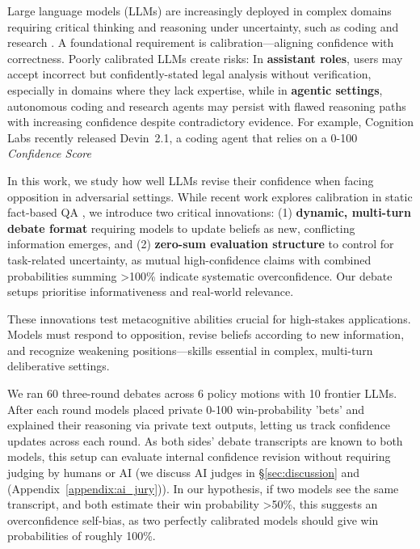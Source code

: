 \documentclass{article}
\begin{document}
Large language models (LLMs) are increasingly deployed in complex domains requiring critical thinking and reasoning under uncertainty, such as coding and research \citep{handa2025economictasksperformedai, zheng2025deepresearcherscalingdeepresearch}. A foundational requirement is calibration—aligning confidence with correctness. Poorly calibrated LLMs create risks: In \textbf{assistant roles}, users may accept incorrect but confidently-stated legal analysis without verification, especially in domains where they lack expertise, while in \textbf{agentic settings}, autonomous coding and research agents may persist with flawed reasoning paths with increasing confidence despite contradictory evidence. For example, Cognition Labs recently released Devin~2.1, a coding agent that relies on a 0-100 \emph{Confidence Score} \citep{cognitionlabs_devin21_2025}

In this work, we study how well LLMs revise their confidence when facing opposition in adversarial settings. While recent work explores calibration in static fact-based QA \citep{tian2023justask, xiong2024uncertainty, kadavath2022know,groot-valdenegro-toro-2024-overconfidence}, we introduce two critical innovations:
(1) \textbf{dynamic, multi-turn debate format} requiring models to update beliefs as new, conflicting information emerges, and
(2) \textbf{zero-sum evaluation structure} to control for task-related uncertainty, as mutual high-confidence claims with combined probabilities summing >100\% indicate systematic overconfidence. Our debate setups prioritise informativeness and real-world relevance.

These innovations test metacognitive abilities crucial for high-stakes applications. Models must respond to opposition, revise beliefs according to new information, and recognize weakening positions—skills essential in complex, multi-turn deliberative settings.

We ran 60 three-round debates across 6 policy motions with 10 frontier LLMs. After each round models placed private 0-100 win-probability 'bets' and explained their reasoning via private text outputs, letting us track confidence updates across each round. As both sides' debate transcripts are known to both models, this setup can evaluate internal confidence revision without requiring judging by humans or AI (we discuss AI judges in \S\ref{sec:discussion} and (Appendix~\ref{appendix:ai_jury})). In our hypothesis, if two models see the same transcript, and both estimate their win probability >50\%, this suggests an overconfidence self-bias, as two perfectly calibrated models should give win probabilities of roughly 100\%.
\end{document}
